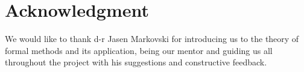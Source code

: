 \section*{Acknowledgment}
We would like to thank d-r Jasen Markovski for introducing us to the theory of formal methods and its application, being our mentor and guiding us all throughout the project with his suggestions and constructive feedback.